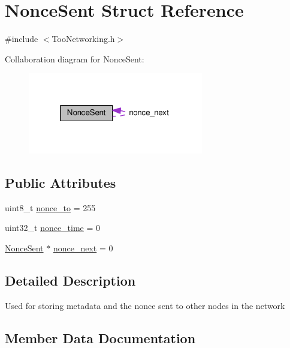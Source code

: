 \hypertarget{structNonceSent}{}\section{Nonce\+Sent Struct Reference}
\label{structNonceSent}


{\ttfamily \#include $<$Too\+Networking.\+h$>$}



Collaboration diagram for Nonce\+Sent\+:
\nopagebreak
\begin{figure}[H]
\begin{center}
\leavevmode
\includegraphics[width=217pt]{structNonceSent__coll__graph}
\end{center}
\end{figure}
\subsection*{Public Attributes}
\begin{DoxyCompactItemize}
\item 
uint8\+\_\+t \hyperlink{structNonceSent_ad5484888a11a0c041610c38b564c5627}{nonce\+\_\+to} = 255
\item 
uint32\+\_\+t \hyperlink{structNonceSent_a346064c4a1c6f06a0563f8dec5446d05}{nonce\+\_\+time} = 0
\item 
\hyperlink{structNonceSent}{Nonce\+Sent} $\ast$ \hyperlink{structNonceSent_a2c795d3fa01adfe453318bad04f7b00b}{nonce\+\_\+next} = 0
\end{DoxyCompactItemize}


\subsection{Detailed Description}
Used for storing metadata and the nonce sent to other nodes in the network 

\subsection{Member Data Documentation}
\mbox{\label{structNonceSent_a2c795d3fa01adfe453318bad04f7b00b}} 
